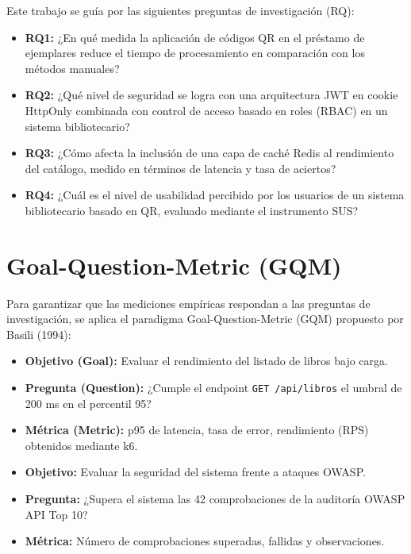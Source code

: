 \documentclass[
11pt,
a4paper,
]{report}
\begin{document}
	Este trabajo se guía por las siguientes preguntas de investigación (RQ):
	
	\begin{itemize}
		\item \textbf{RQ1:} ¿En qué medida la aplicación de códigos QR en el préstamo de ejemplares reduce el tiempo de procesamiento en comparación con los métodos manuales?
		\item \textbf{RQ2:} ¿Qué nivel de seguridad se logra con una arquitectura JWT en cookie HttpOnly combinada con control de acceso basado en roles (RBAC) en un sistema bibliotecario?
		\item \textbf{RQ3:} ¿Cómo afecta la inclusión de una capa de caché Redis al rendimiento del catálogo, medido en términos de latencia y tasa de aciertos?
		\item \textbf{RQ4:} ¿Cuál es el nivel de usabilidad percibido por los usuarios de un sistema bibliotecario basado en QR, evaluado mediante el instrumento SUS?
	\end{itemize}
	
	\hypertarget{goal-question-metric}{%
		\section{Goal-Question-Metric (GQM)}\label{goal-question-metric}}
	
	Para garantizar que las mediciones empíricas respondan a las preguntas de investigación, se aplica el paradigma Goal-Question-Metric (GQM) propuesto por Basili (1994):
	
	\begin{itemize}
		\item \textbf{Objetivo (Goal):} Evaluar el rendimiento del listado de libros bajo carga.
		\item \textbf{Pregunta (Question):} ¿Cumple el endpoint \texttt{GET /api/libros} el umbral de 200 ms en el percentil 95?
		\item \textbf{Métrica (Metric):} p95 de latencia, tasa de error, rendimiento (RPS) obtenidos mediante k6.
	\end{itemize}
	
	\begin{itemize}
		\item \textbf{Objetivo:} Evaluar la seguridad del sistema frente a ataques OWASP.
		\item \textbf{Pregunta:} ¿Supera el sistema las 42 comprobaciones de la auditoría OWASP API Top 10?
		\item \textbf{Métrica:} Número de comprobaciones superadas, fallidas y observaciones.
	\end{itemize}
	
\end{document}
